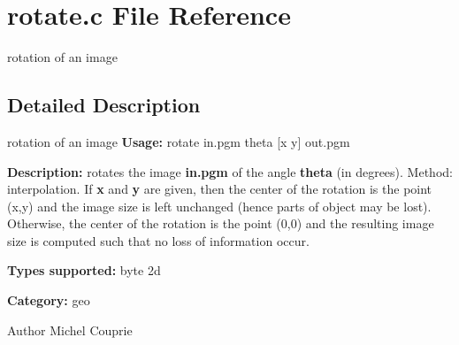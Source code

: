 \section{rotate.c File Reference}
\label{rotate_8c}


rotation of an image  




\subsection{Detailed Description}
rotation of an image {\bfseries Usage:} rotate in.pgm theta [x y] out.pgm

{\bfseries Description:} rotates the image {\bfseries in.pgm} of the angle {\bfseries theta} (in degrees). Method: interpolation. If {\bfseries x} and {\bfseries y} are given, then the center of the rotation is the point (x,y) and the image size is left unchanged (hence parts of object may be lost). Otherwise, the center of the rotation is the point (0,0) and the resulting image size is computed such that no loss of information occur.

{\bfseries Types supported:} byte 2d

{\bfseries Category:} geo

\begin{DoxyAuthor}{Author}
Michel Couprie 
\end{DoxyAuthor}

